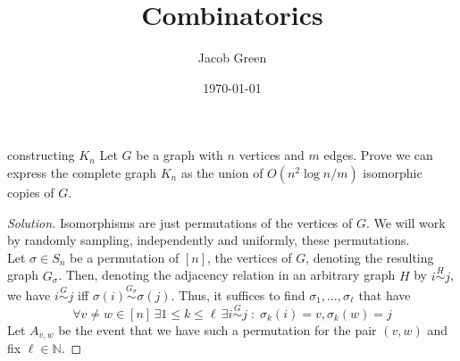 \documentclass{article}
\title{Combinatorics}
\author{Jacob Green}
\date{\today}
\newcommand\csim[1]{\stackrel{{\scriptscriptstyle #1}}{\sim}}
\begin{document}
\begin{problem}[]{constructing $K_n$}
    Let $G$ be a graph with $n$ vertices and $m$ edges. Prove we can express the complete graph $K_n$ as the union 
    of $O(n^2\log n /m)$ isomorphic copies of $G$.  
\end{problem}

\begin{proof}[Solution]
    Isomorphisms are just permutations of the vertices of $G$. We will work by randomly sampling, independently and 
    uniformly, these permutations. \\

    Let $\sigma \in S_n$ be a permutation of $[n]$, the vertices of $G$, denoting the resulting graph 
    $G_\sigma$. Then, denoting the adjacency relation in an arbitrary graph $H$ by $i \csim{H} j$, we have 
    $i \csim{G} j$ iff $\sigma(i) \csim{G_\sigma} \sigma(j)$. Thus, it suffices to find $\sigma_1, \dots, \sigma_\ell$ 
    that have 
    \[\forall v \neq w \in [n] \, \exists 1 \leq k \leq \ell \, \exists i \csim{G} j \; : \; \sigma_k(i) = v,
    \sigma_k(w) = j\]
    Let $A_{v,w}$ be the event that we have such a permutation for the pair $(v, w)$ and fix $\ell \in \mathbb{N}$.
      
    
\end{proof}
\end{document}
